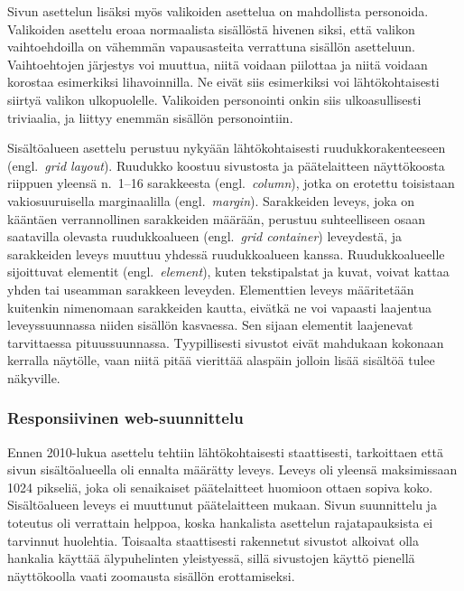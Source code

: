 \documentclass[finnish, 12pt, a4paper, elec, utf8, a-1b, online]{aaltothesis}
\begin{document}
Sivun asettelun lisäksi myös valikoiden asettelua on mahdollista personoida.
Valikoiden asettelu eroaa normaalista sisällöstä hivenen siksi, että valikon
vaihtoehdoilla on vähemmän vapausasteita verrattuna sisällön asetteluun.
Vaihtoehtojen järjestys voi muuttua, niitä voidaan piilottaa ja niitä voidaan
korostaa esimerkiksi lihavoinnilla. Ne eivät siis esimerkiksi voi
lähtökohtaisesti siirtyä valikon ulkopuolelle. Valikoiden personointi onkin siis
ulkoasullisesti triviaalia, ja liittyy enemmän sisällön personointiin.

Sisältöalueen asettelu perustuu nykyään lähtökohtaisesti ruudukkorakenteeseen
(engl.~\textit{grid layout}). Ruudukko koostuu sivustosta ja päätelaitteen
näyttökoosta riippuen yleensä n.~1--16 sarakkeesta (engl.~\textit{column}),
jotka on erotettu toisistaan vakiosuuruisella marginaalilla
(engl.~\textit{margin}). Sarakkeiden leveys, joka on kääntäen verrannollinen
sarakkeiden määrään, perustuu suhteelliseen osaan saatavilla olevasta
ruudukkoalueen (engl.~\textit{grid container}) leveydestä, ja sarakkeiden leveys
muuttuu yhdessä ruudukkoalueen kanssa. Ruudukkoalueelle sijoittuvat elementit
(engl.~\textit{element}), kuten tekstipalstat ja kuvat, voivat kattaa yhden tai
useamman sarakkeen leveyden. Elementtien leveys määritetään kuitenkin nimenomaan
sarakkeiden kautta, eivätkä ne voi vapaasti laajentua leveyssuunnassa niiden
sisällön kasvaessa. Sen sijaan elementit laajenevat tarvittaessa
pituussuunnassa. Tyypillisesti sivustot eivät mahdukaan kokonaan kerralla
näytölle, vaan niitä pitää vierittää alaspäin jolloin lisää sisältöä tulee
näkyville.

\subsubsection{Responsiivinen web-suunnittelu}\label{responsive-web-design}

Ennen 2010-lukua asettelu tehtiin lähtökohtaisesti staattisesti, tarkoittaen
että sivun sisältöalueella oli ennalta määrätty leveys. Leveys oli yleensä
maksimissaan 1024 pikseliä, joka oli senaikaiset päätelaitteet huomioon ottaen
sopiva koko. Sisältöalueen leveys ei muuttunut päätelaitteen mukaan. Sivun
suunnittelu ja toteutus oli verrattain helppoa, koska hankalista asettelun
rajatapauksista ei tarvinnut huolehtia. Toisaalta staattisesti rakennetut
sivustot alkoivat olla hankalia käyttää älypuhelinten yleistyessä, sillä
sivustojen käyttö pienellä näyttökoolla vaati zoomausta sisällön erottamiseksi.
\end{document}
